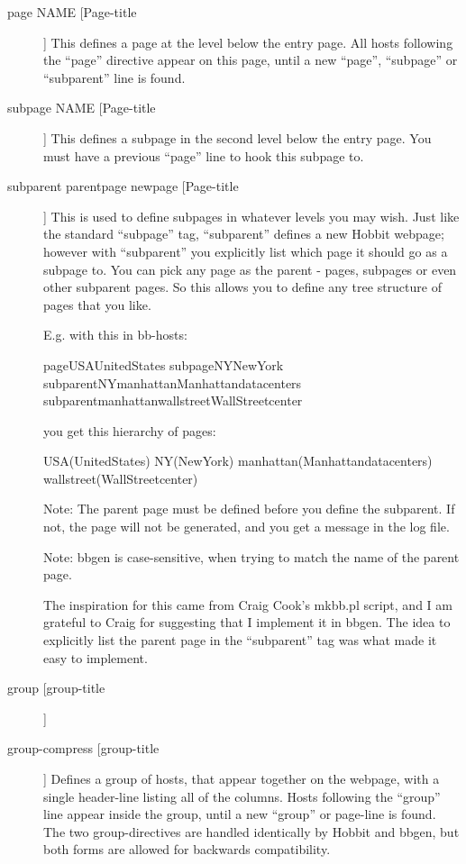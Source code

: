  \begin{description}
\item[page NAME [Page-title]] This defines a page at the level below
  the entry page. All hosts following the ``page'' directive appear on
  this page, until a new ``page'', ``subpage'' or ``subparent'' line
  is found. 


 

\item[subpage NAME [Page-title]] This defines a subpage in the second
  level below the entry page. You must have a previous ``page'' line
  to hook this subpage to. 


 

\item[subparent parentpage newpage [Page-title]] This is used to
  define subpages in whatever levels you may wish. Just like the
  standard ``subpage'' tag, ``subparent'' defines a new Hobbit
  webpage; however with ``subparent'' you explicitly list which page
  it should go as a subpage to. You can pick any page as the parent -
  pages, subpages or even other subparent pages. So this allows you to
  define any tree structure of pages that you like. 


  E.g. with this in bb-hosts: 


  
pageUSAUnitedStates  
subpageNYNewYork  
subparentNYmanhattanManhattandatacenters  
subparentmanhattanwallstreetWallStreetcenter 


  you get this hierarchy of pages: 


  
USA(UnitedStates)  
NY(NewYork)  
manhattan(Manhattandatacenters)  
wallstreet(WallStreetcenter) 


  Note: The parent page must be defined before you define the
  subparent. If not, the page will not be generated, and you get a
  message in the log file. 



  Note: bbgen is case-sensitive, when trying to match the name of the parent page. 


  The inspiration for this came from Craig Cook's mkbb.pl script, and
  I am grateful to Craig for suggesting that I implement it in
  bbgen. The idea to explicitly list the parent page in the
  ``subparent'' tag was what made it easy to implement. 



 

\item[group [group-title]]
\item[group-compress [group-title]] Defines a group of hosts, that
  appear together on the webpage, with a single header-line listing
  all of the columns. Hosts following the ``group'' line appear inside
  the group, until a new ``group'' or page-line is found. The two
  group-directives are handled identically by Hobbit and bbgen, but
  both forms are allowed for backwards compatibility. 



\end{description}
